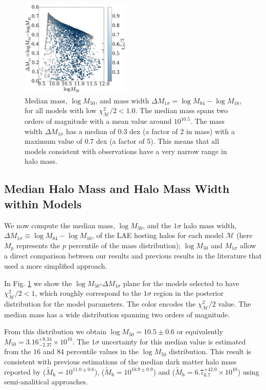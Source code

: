 \documentclass{emulateapj}
\newcommand{\hMsun}{{\ifmmode{h^{-1}{\rm {M_{\odot}}}}\else{$h^{-1}{\rm{M_{\odot}}}$}\fi}}
\begin{document}
\begin{figure}
\includegraphics[width=0.47\textwidth]{fig4.pdf}
\caption{Median mass, $\log M_{50}$, and mass width $\Delta
  M_{1\sigma}=\log M_{84} - \log M_{16}$, for all models with low
  $\chi^2_{\mathcal{M}}/2 < 1.0$. The median mass spans two orders of
  magnitude with a mean value around $10^{10.5}$\hMsun. The
  mass width $\Delta M_{1\sigma}$ has a median of $0.3$ dex (a factor
  of $2$ in mass) with a maximum value of $0.7$ dex (a factor of
  5). This means that all models consistent with observations have a
  very narrow range in halo mass.}
\label{fig:mmed}
\end{figure}

\subsection{Median Halo Mass and Halo Mass Width within Models}

We now compute the median mass, $\log M_{50}$, and the $1\sigma$ halo mass
width, $\Delta M_{1\sigma} \equiv \log M_{84} - \log M_{16}$, of the
LAE hosting halos for each model  $\mathcal{M}$ (here $M_{p}$
represents the $p$ percentile of the mass distribution); $\log M_{50}$
and $M_{1\sigma}$ allow a direct comparison between our results and
previous results in the literature
\citep[e.g.][]{Hayashino2004,Gawiser2007,Ouchi2010,Bielby16} that used
a more simplified approach. 

In Fig. \ref{fig:mmed} we show the $\log M_{50}$-$\Delta M_{1\sigma}$
plane for the models selected to have $\chi^{2}_{\mathcal{M}}/2 < 1$,
which roughly correspond to the $1\sigma$ region in the posterior
distribution for the model parameters. The color encodes the
$\chi^{2}_{\mathcal{M}}/2$ value. The median mass has a wide distribution
spanning two orders of magnitude.

From this distribution we obtain $\log M_{50} = 10.5\pm 0.6$ or
equivalently $M_{50} = 3.16^{+9.34}_{-2.37}\times 10^{10}$\hMsun.  
The $1\sigma$ uncertainty for this median value is estimated from the
$16$ and $84$ percentile values in the $\log M_{50}$ distribution.  
This result is consistent with previous
 estimations of  the  median dark matter halo mass reported by
 \citet{Bielby16} ($\tilde{M}_{\mathrm h} = 10^{11.0\pm0.6}$),
 \citet{Gawiser07} ($\tilde{M}_{\mathrm h} = 10^{10.9\pm0.9}$) and
 \citet{Ouchi2010} ($\tilde{M}_{\mathrm h} =
 6.7^{+42.0}_{6.7}\times10^{10}$) using semi-analitical approaches.   
\end{document}
